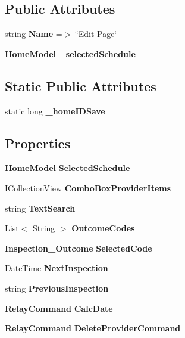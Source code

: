\subsection*{Public Attributes}
\begin{DoxyCompactItemize}
\item 
string \textbf{ Name} =$>$ \char`\"{}Edit Page\char`\"{}
\item 
\textbf{ Home\+Model} \textbf{ \+\_\+selected\+Schedule}
\end{DoxyCompactItemize}
\subsection*{Static Public Attributes}
\begin{DoxyCompactItemize}
\item 
static long \textbf{ \+\_\+home\+I\+D\+Save}
\end{DoxyCompactItemize}
\subsection*{Properties}
\begin{DoxyCompactItemize}
\item 
\textbf{ Home\+Model} \textbf{ Selected\+Schedule}\hspace{0.3cm}{\ttfamily  [get, set]}
\item 
I\+Collection\+View \textbf{ Combo\+Box\+Provider\+Items}\hspace{0.3cm}{\ttfamily  [get]}
\item 
string \textbf{ Text\+Search}\hspace{0.3cm}{\ttfamily  [get, set]}
\item 
List$<$ String $>$ \textbf{ Outcome\+Codes}\hspace{0.3cm}{\ttfamily  [get, set]}
\item 
\textbf{ Inspection\+\_\+\+Outcome} \textbf{ Selected\+Code}\hspace{0.3cm}{\ttfamily  [get, set]}
\item 
Date\+Time \textbf{ Next\+Inspection}\hspace{0.3cm}{\ttfamily  [get, set]}
\item 
string \textbf{ Previous\+Inspection}\hspace{0.3cm}{\ttfamily  [get, set]}
\item 
\textbf{ Relay\+Command} \textbf{ Calc\+Date}\hspace{0.3cm}{\ttfamily  [get]}
\item 
\textbf{ Relay\+Command} \textbf{ Delete\+Provider\+Command}\hspace{0.3cm}{\ttfamily  [get]}
\end{DoxyCompactItemize}
